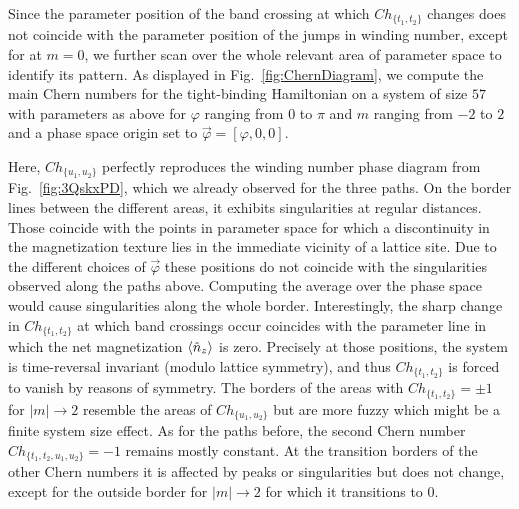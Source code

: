 \documentclass[submission, Phys]{SciPost}
\begin{document}
Since the parameter position of the band crossing at which $Ch_{\lbrace t_1, t_2 \rbrace }$ changes does not coincide with the parameter position of the jumps in winding number, except for at $m=0$, we further scan over the whole relevant area of parameter space to identify its pattern. As displayed in Fig.~\ref{fig:ChernDiagram}, we compute the main Chern numbers for the tight-binding Hamiltonian on a system of size $57$ with parameters as above for $\varphi$ ranging from $0$ to $\pi$ and $m$ ranging from $-2$ to $2$ and a phase space origin set to $\vec{\varphi}=[\varphi,0,0]$.
\figureXI

Here, $Ch_{\lbrace u_1, u_2 \rbrace }$ perfectly reproduces the winding number phase diagram from Fig.~\ref{fig:3QskxPD}, which we already observed for the three paths.
On the border lines between the different areas, it exhibits singularities at regular distances. Those coincide with the points in parameter space for which a discontinuity in the magnetization texture lies in the immediate vicinity of a lattice site. Due to the different choices of $\vec{\varphi}$ these positions do not coincide with the singularities observed along the paths above. Computing the average over the phase space would cause singularities along the whole border.
Interestingly, the sharp change in $Ch_{\lbrace t_1, t_2 \rbrace }$ at which band crossings occur coincides with the parameter line in which the net magnetization $\braket{\hat{n}_z}$ is zero.
Precisely at those positions, the system is time-reversal invariant (modulo lattice symmetry), and thus $Ch_{\lbrace t_1, t_2 \rbrace }$ is forced to vanish by reasons of symmetry. 
The borders of the areas with $Ch_{\lbrace t_1, t_2 \rbrace }=\pm1$ for $|m|\to 2$ resemble the areas of $Ch_{\lbrace u_1, u_2 \rbrace }$ but are more fuzzy which might be a finite system size effect.
As for the paths before, the second Chern number $Ch_{\lbrace t_1, t_2, u_1, u_2 \rbrace }=-1$ remains mostly constant. At the transition borders of the other Chern numbers it is affected by peaks or singularities but does not change, except for the outside border for $|m|\to 2$ for which it transitions to $0$.
\end{document}
